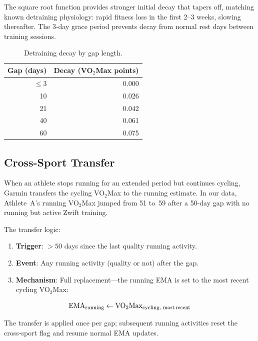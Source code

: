 \documentclass[11pt,a4paper]{article}
\begin{document}
The square root function provides stronger initial decay that tapers off, matching known detraining physiology: rapid fitness loss in the first 2--3 weeks, slowing thereafter.
The 3-day grace period prevents decay from normal rest days between training sessions.

\begin{table}[H]
\centering
\caption{Detraining decay by gap length.}
\label{tab:decay}
\begin{tabular}{@{}rr@{}}
\toprule
\textbf{Gap (days)} & \textbf{Decay (VO$_2$Max points)} \\
\midrule
$\leq 3$  & 0.000 \\
10         & 0.026 \\
21         & 0.042 \\
40         & 0.061 \\
60         & 0.075 \\
\bottomrule
\end{tabular}
\end{table}


\subsection{Cross-Sport Transfer}
\label{sec:cross-sport}

When an athlete stops running for an extended period but continues cycling, Garmin transfers the cycling VO$_2$Max to the running estimate.
In our data, Athlete~A's running VO$_2$Max jumped from 51 to~59 after a 50-day gap with no running but active Zwift training.

The transfer logic:
\begin{enumerate}[nosep]
    \item \textbf{Trigger}: $> 50$ days since the last quality running activity.
    \item \textbf{Event}: Any running activity (quality or not) after the gap.
    \item \textbf{Mechanism}: Full replacement---the running EMA is set to the most recent cycling VO$_2$Max:
\end{enumerate}
\begin{equation}
\text{EMA}_{\text{running}} \leftarrow \text{VO}_2\text{Max}_{\text{cycling, most\,recent}}
\label{eq:cross-sport}
\end{equation}

The transfer is applied once per gap; subsequent running activities reset the cross-sport flag and resume normal EMA updates.
\end{document}
